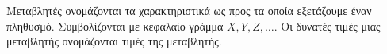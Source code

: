 Μεταβλητές ονομάζονται τα χαρακτηριστικά ως προς τα οποία εξετάζουμε έναν πληθυσμό. Συμβολίζονται με κεφαλαίο γράμμα $ X,Y,Z,\ldots $. Οι δυνατές τιμές μιας μεταβλητής ονομάζονται τιμές της μεταβλητής.
